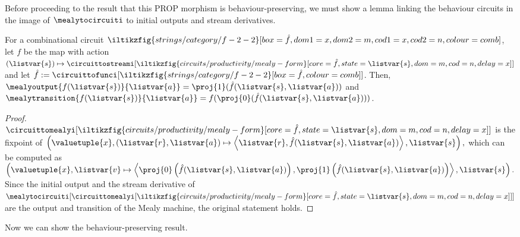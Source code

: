 Before proceeding to the result that this PROP morphism is behaviour-preserving,
we must show a lemma linking the behaviour circuits in the image of
\(\mealytocircuiti\) to initial outputs and stream derivatives.

\begin{proposition}
    \label{prop:mealy-form-image}
    For a combinational circuit \(
    \iltikzfig{strings/category/f-2-2}[box=\hat{f},dom1=x,dom2=m,cod1=x,cod2=n,colour=comb]
    \), let \(f\) be the map with action \(
    (\listvar{s}) \mapsto
    \circuittostreami[
        \iltikzfig{circuits/productivity/mealy-form}[core=\hat{f},state=\listvar{s},dom=m,cod=n,delay=x]
    ]
    \) and let \(
    \hat{f}
    :=
    \circuittofunci[
        \iltikzfig{strings/category/f-2-2}[box=\hat{f},colour=comb]
    ]
    \).
    Then, \(
    \mealyoutput{f(\listvar{s})}{\listvar{a}}
    =
    \proj{1}(\hat{f}(\listvar{s}, \listvar{a}))
    \) and \(
    \mealytransition{f(\listvar{s})}{\listvar{a}}
    =
    f(\proj{0}(\hat{f}(\listvar{s}, \listvar{a})))
    \).
\end{proposition}
\begin{proof}
    \(\circuittomealyi[
        \iltikzfig{circuits/productivity/mealy-form}[core=\hat{f},state=\listvar{s},dom=m,cod=n,delay=x]
    ]\) is the fixpoint of \(
    \left(\valuetuple{x},
    (\listvar{r}, \listvar{a}) \mapsto \left\langle
    \listvar{r}, \hat{f}(\listvar{s}, \listvar{a})
    \right\rangle, \listvar{s}\right),
    \) which can be computed as \(
    \left(\valuetuple{x},
    \listvar{v} \mapsto \left\langle
    \proj{0}\left(\hat{f}(\listvar{s},\listvar{a})\right),
    \proj{1}\left(\hat{f}(\listvar{s}, \listvar{a})\right)
    \right\rangle, \listvar{s}\right).
    \)
    Since the initial output and the stream derivative of \(
    \mealytocircuiti[
        \circuittomealyi[
            \iltikzfig{circuits/productivity/mealy-form}[core=\hat{f},state=\listvar{s},dom=m,cod=n,delay=x]
        ]
    ]
    \) are the output and transition of the Mealy machine, the original
    statement holds.
\end{proof}

Now we can show the behaviour-preserving result.

